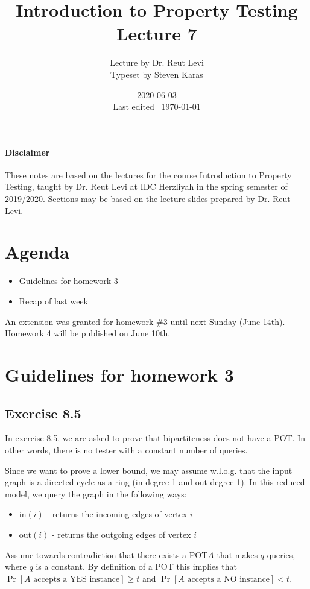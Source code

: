 \documentclass{idc_msc}
\title{Introduction to Property Testing \\\large Lecture 7}
\date{2020-06-03 \\ Last edited \currenttime\ \today}
\author{Lecture by Dr. Reut Levi\\Typeset by Steven Karas}
\begin{document}
\nocite{goldreich2017introduction}

\paragraph{Disclaimer}

These notes are based on the lectures for the course Introduction to Property Testing, taught by Dr. Reut Levi at IDC Herzliyah in the spring semester of 2019/2020.
Sections may be based on the lecture slides prepared by Dr. Reut Levi.

\section{Agenda}

  \begin{itemize}
    \item Guidelines for homework 3
    \item Recap of last week
  \end{itemize}

An extension was granted for homework \#3 until next Sunday (June 14th).
Homework 4 will be published on June 10th.

\section{Guidelines for homework 3}

\subsection{Exercise 8.5}

In exercise 8.5, we are asked to prove that bipartiteness does not have a POT.
In other words, there is no tester with a constant number of queries.

Since we want to prove a lower bound, we may assume w.l.o.g. that the input graph is a directed cycle as a ring (in degree 1 and out degree 1).
In this reduced model, we query the graph in the following ways:

\begin{itemize}
  \item \(\textrm{in}(i)\) - returns the incoming edges of vertex \(i\)
  \item \(\textrm{out}(i)\) - returns the outgoing edges of vertex \(i\)
\end{itemize}

Assume towards contradiction that there exists a POT\footnotemark \(A\) that makes \(q\) queries, where \(q\) is a constant.
By definition of a POT this implies that \(\Pr[A \textrm{ accepts a YES instance}] \ge t\) and \(\Pr[A \textrm{ accepts a NO instance}] < t\).
\end{document}
